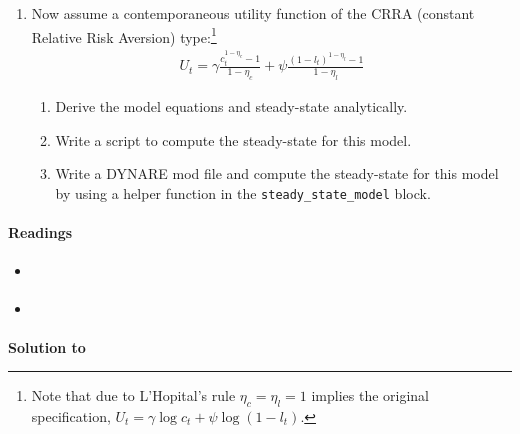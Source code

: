 \begin{enumerate}
\item Now assume a contemporaneous utility function of the CRRA (constant Relative Risk Aversion) type:\footnote{%
    Note that due to {L'Hopital}'s rule \(\eta_c=\eta_l=1\) implies the original specification, \(U_t=\gamma \log c_t + \psi \log(1-l_t)\).}
\begin{align*}
    U_t = \gamma \frac{c_{t}^{1-\eta_c}-1}{1-\eta_c} + \psi \frac{{(1-l_{t})}^{1-\eta_l}-1}{1-\eta_l}
\end{align*}
\begin{enumerate}
    \item Derive the model equations and steady-state analytically.
    \item Write a script to compute the steady-state for this model.
    \item Write a DYNARE mod file and compute the steady-state for this model by using a helper function in the \texttt{steady\_state\_model} block.
\end{enumerate}

\end{enumerate}

\paragraph{Readings}
\begin{itemize}
	\item \textcite[Ch.~3, Ch.~6]{McCandless_2008_ABCsRBCsIntroduction}
	\item \textcite[Ch.~1, Ch.~2]{Torres_2013_IntroductionDynamicMacroeconomic}
\end{itemize}

\begin{solution}\textbf{Solution to }
\ifDisplaySolutions

\fi
\newpage
\end{solution}